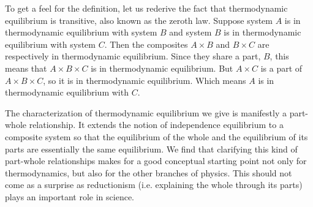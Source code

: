 \documentclass[letterpaper,twocolumn]{article}
\begin{document}
To get a feel for the definition, let us rederive the fact that thermodynamic equilibrium is transitive, also known as the zeroth law. Suppose system $A$ is in thermodynamic equilibrium with system $B$ and system $B$ is in thermodynamic equilibrium with system $C$. Then the composites $A \times B$ and $B \times C$ are respectively in thermodynamic equilibrium. Since they share a part, $B$, this means that $A \times B \times C$ is in thermodynamic equilibrium. But $A \times C$ is a part of $A \times B \times C$, so it is in thermodynamic equilibrium. Which means $A$ is in thermodynamic equilibrium with $C$.

The characterization of thermodynamic equilibrium we give is manifestly a part-whole relationship. It extends the notion of independence equilibrium to a composite system so that the equilibrium of the whole and the equilibrium of its parts are essentially the same equilibrium. We find that clarifying this kind of part-whole relationships makes for a good conceptual starting point not only for thermodynamics, but also for the other branches of physics. This should not come as a surprise as reductionism (i.e. explaining the whole through its parts) plays an important role in science.


%
\end{document}
